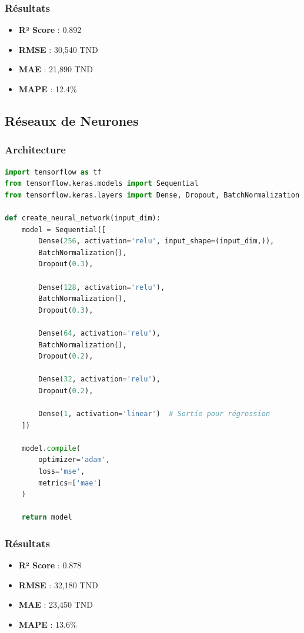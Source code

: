 \subsubsection{Résultats}
\begin{itemize}
    \item \textbf{R² Score} : 0.892
    \item \textbf{RMSE} : 30,540 TND
    \item \textbf{MAE} : 21,890 TND
    \item \textbf{MAPE} : 12.4\%
\end{itemize}

\subsection{Réseaux de Neurones}

\subsubsection{Architecture}
\begin{lstlisting}[language=Python, caption=Architecture du réseau de neurones]
import tensorflow as tf
from tensorflow.keras.models import Sequential
from tensorflow.keras.layers import Dense, Dropout, BatchNormalization

def create_neural_network(input_dim):
    model = Sequential([
        Dense(256, activation='relu', input_shape=(input_dim,)),
        BatchNormalization(),
        Dropout(0.3),
        
        Dense(128, activation='relu'),
        BatchNormalization(),
        Dropout(0.3),
        
        Dense(64, activation='relu'),
        BatchNormalization(),
        Dropout(0.2),
        
        Dense(32, activation='relu'),
        Dropout(0.2),
        
        Dense(1, activation='linear')  # Sortie pour régression
    ])
    
    model.compile(
        optimizer='adam',
        loss='mse',
        metrics=['mae']
    )
    
    return model
\end{lstlisting}

\subsubsection{Résultats}
\begin{itemize}
    \item \textbf{R² Score} : 0.878
    \item \textbf{RMSE} : 32,180 TND
    \item \textbf{MAE} : 23,450 TND
    \item \textbf{MAPE} : 13.6\%
\end{itemize}

